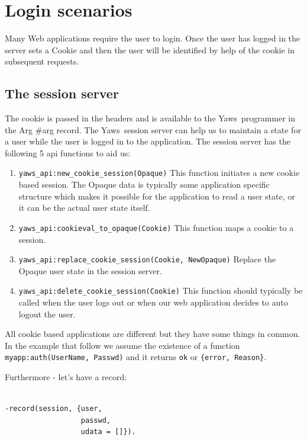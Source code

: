 \documentclass[11pt,oneside,english]{book}
\newcommand{\Yaws}            %
        {{\sc Yaws}}
\begin{document}
\section{Login scenarios}

Many Web applications require the user to login. Once the user has
logged in the server sets a Cookie and then the user will be
identified by help of the cookie in subsequent requests.

  \subsection{The session server}
The cookie is passed in the headers and is available to the \Yaws\
programmer in the Arg \#arg record. The \Yaws\  session server
can help us to maintain a state for a user while the user is
logged in to the application. The session server has the following 5
api functions to aid us:

\begin{enumerate}

\item \verb+yaws_api:new_cookie_session(Opaque)+
This function initiates a new cookie based session. The Opaque data
is typically some application specific structure which makes it
possible for the application to read a user state, or it can be the
actual user state itself.

\item \verb+yaws_api:cookieval_to_opaque(Cookie)+
This function maps a cookie to a session.

\item \verb+yaws_api:replace_cookie_session(Cookie, NewOpaque)+
Replace the Opaque user state in the session server.

\item \verb+yaws_api:delete_cookie_session(Cookie)+
This function should typically be called when the user logs out
or when our web application decides to auto logout the user.

\end{enumerate}


All cookie based applications are different but they have
some things in common. In the example that follow we assume the
existence of a function \verb+myapp:auth(UserName, Passwd)+ and it
returns \verb+ok+ or \verb+{error, Reason}+.

Furthermore - let's have a record:

\begin{verbatim}

-record(session, {user,
                  passwd,
                  udata = []}).

\end{verbatim}
\end{document}
